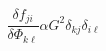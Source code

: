 \begin{equation}
\frac{\delta f_{ji}}{\delta \Phi_{k \ell}} \alpha G^2 \delta_{kj} \delta_
{i\ell}
\end{equation}

